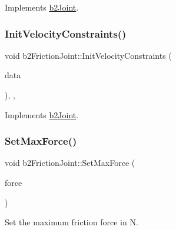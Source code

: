 Implements \mbox{\hyperlink{classb2_joint_ae355e441c2aa842777dc04e24f15ced0}{b2\+Joint}}.

\mbox{\label{classb2_friction_joint_afce4006666e83c50d2017b5ff5e7ca2d}} 
\subsubsection{\texorpdfstring{InitVelocityConstraints()}{InitVelocityConstraints()}}
{\footnotesize\ttfamily void b2\+Friction\+Joint\+::\+Init\+Velocity\+Constraints (\begin{DoxyParamCaption}\item[{const \mbox{\hyperlink{structb2_solver_data}{b2\+Solver\+Data}} \&}]{data }\end{DoxyParamCaption})\hspace{0.3cm}{\ttfamily [override]}, {\ttfamily [protected]}, {\ttfamily [virtual]}}



Implements \mbox{\hyperlink{classb2_joint_a599c013de5514e02684b958b31dd76a4}{b2\+Joint}}.

\mbox{\label{classb2_friction_joint_a7936d852b5ad71dc92efc397865dda41}} 
\subsubsection{\texorpdfstring{SetMaxForce()}{SetMaxForce()}}
{\footnotesize\ttfamily void b2\+Friction\+Joint\+::\+Set\+Max\+Force (\begin{DoxyParamCaption}\item[{\mbox{\hyperlink{b2_settings_8h_aacdc525d6f7bddb3ae95d5c311bd06a1}{float32}}}]{force }\end{DoxyParamCaption})}



Set the maximum friction force in N. 

\mbox{\label{classb2_friction_joint_a9e3aaf485dc86a378bb62ee78cea43aa}} 

